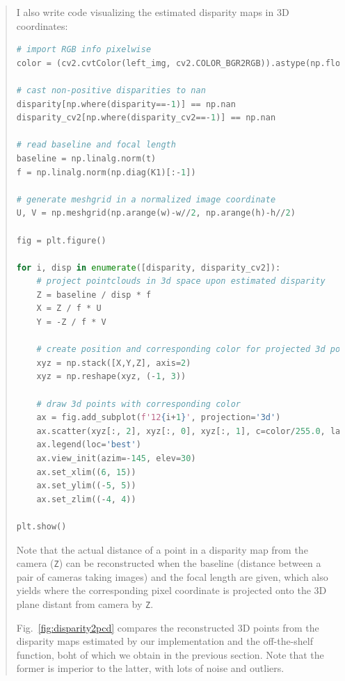 \documentclass[11pt]{article}
\begin{document}
\begin{quote}
I also write code visualizing the estimated disparity maps in 3D coordinates:

\begin{lstlisting}[language=Python, basicstyle=\scriptsize]
# import RGB info pixelwise 
color = (cv2.cvtColor(left_img, cv2.COLOR_BGR2RGB)).astype(np.float64).reshape(-1, 3)

# cast non-positive disparities to nan
disparity[np.where(disparity==-1)] == np.nan
disparity_cv2[np.where(disparity_cv2==-1)] == np.nan

# read baseline and focal length
baseline = np.linalg.norm(t)
f = np.linalg.norm(np.diag(K1)[:-1])

# generate meshgrid in a normalized image coordinate
U, V = np.meshgrid(np.arange(w)-w//2, np.arange(h)-h//2)

fig = plt.figure()

for i, disp in enumerate([disparity, disparity_cv2]):
    # project pointclouds in 3d space upon estimated disparity
    Z = baseline / disp * f
    X = Z / f * U
    Y = -Z / f * V
    
    # create position and corresponding color for projected 3d points
    xyz = np.stack([X,Y,Z], axis=2)
    xyz = np.reshape(xyz, (-1, 3))

    # draw 3d points with corresponding color
    ax = fig.add_subplot(f'12{i+1}', projection='3d')
    ax.scatter(xyz[:, 2], xyz[:, 0], xyz[:, 1], c=color/255.0, label='Points')
    ax.legend(loc='best')
    ax.view_init(azim=-145, elev=30)
    ax.set_xlim((6, 15))
    ax.set_ylim((-5, 5))
    ax.set_zlim((-4, 4))

plt.show()
\end{lstlisting}

Note that the actual distance of a point in a disparity map from the camera (\texttt{Z}) can be reconstructed when the baseline (distance between a pair of cameras taking images) and the focal length are given, which also yields where the corresponding pixel coordinate is projected onto the 3D plane distant from camera by \texttt{Z}. 

Fig.~\ref{fig:disparity2pcd} compares the reconstructed 3D points from the disparity maps estimated by our implementation and the off-the-shelf function, boht of which we obtain in the previous section. Note that the former is imperior to the latter, with lots of noise and outliers.


\end{quote}
\end{document}
